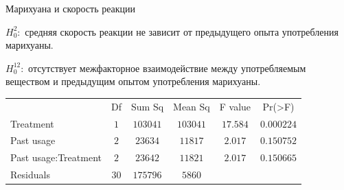 \documentclass[9pt,pdf,utf8,hyperref={unicode},aspectratio=169]{beamer}
\begin{document}
\begin{frame}{Марихуана и скорость реакции}
{    $H_0^2\colon$ средняя скорость реакции не зависит от предыдущего опыта употребления марихуаны.

    $H_0^{12}\colon$ отсутствует межфакторное взаимодействие между употребляемым веществом и предыдущим опытом употребления марихуаны.

    \bigskip

    \begin{center}
     \begin{tabular}{lccccc}
                                        & Df   &Sum Sq   &Mean Sq   &F value   &  Pr(>F)    \\
                                        Treatment           &  $1$ &$103041$ & $103041$ & $17.584$ &$0.000224$\\
                                        Past usage          &  $2$ &$ 23634$ & $ 11817$ & $ 2.017$ &$0.150752$            \\            
                                        Past usage:Treatment&  $2$ &$ 23642$ & $ 11821$ & $ 2.017$ &$0.150665$    \\
                                        Residuals           & $30$ &$175796$ & $  5860$ &          &                  
     \end{tabular}
     \end{center}
     

    }

    
%    	
\end{frame}
\end{document}
